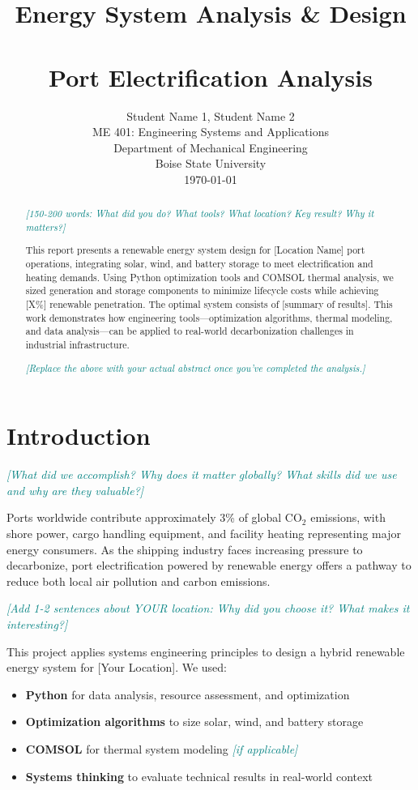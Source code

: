 \documentclass[11pt,letterpaper]{article}
\title{\textbf{Energy System Analysis \& Design \\ [Your Location]\\
Port Electrification Analysis}}
\author{
    Student Name 1, Student Name 2 \\
    \small ME 401: Engineering Systems and Applications\\
    \small Department of Mechanical Engineering \\
    \small Boise State University \\
    \small \today
}
\date{}
\newcommand{\hint}[1]{\textcolor{teal}{\small\textit{[#1]}}}
\begin{document}
\maketitle

\begin{abstract}
\hint{150-200 words: What did you do? What tools? What location? Key result? Why it matters?}

This report presents a renewable energy system design for [Location Name] port operations, integrating solar, wind, and battery storage to meet electrification and heating demands. Using Python optimization tools and COMSOL thermal analysis, we sized generation and storage components to minimize lifecycle costs while achieving [X\%] renewable penetration. The optimal system consists of [summary of results]. This work demonstrates how engineering tools—optimization algorithms, thermal modeling, and data analysis—can be applied to real-world decarbonization challenges in industrial infrastructure.

\hint{Replace the above with your actual abstract once you've completed the analysis.}
\end{abstract}

\section{Introduction}

\hint{What did we accomplish? Why does it matter globally? What skills did we use and why are they valuable?}

Ports worldwide contribute approximately 3\% of global CO$_2$ emissions, with shore power, cargo handling equipment, and facility heating representing major energy consumers. As the shipping industry faces increasing pressure to decarbonize, port electrification powered by renewable energy offers a pathway to reduce both local air pollution and carbon emissions.

\hint{Add 1-2 sentences about YOUR location: Why did you choose it? What makes it interesting?}

This project applies systems engineering principles to design a hybrid renewable energy system for [Your Location]. We used:
\begin{itemize}
    \item \textbf{Python} for data analysis, resource assessment, and optimization
    \item \textbf{Optimization algorithms} to size solar, wind, and battery storage
    \item \textbf{COMSOL} for thermal system modeling \hint{if applicable}
    \item \textbf{Systems thinking} to evaluate technical results in real-world context
\end{itemize}
\end{document}
